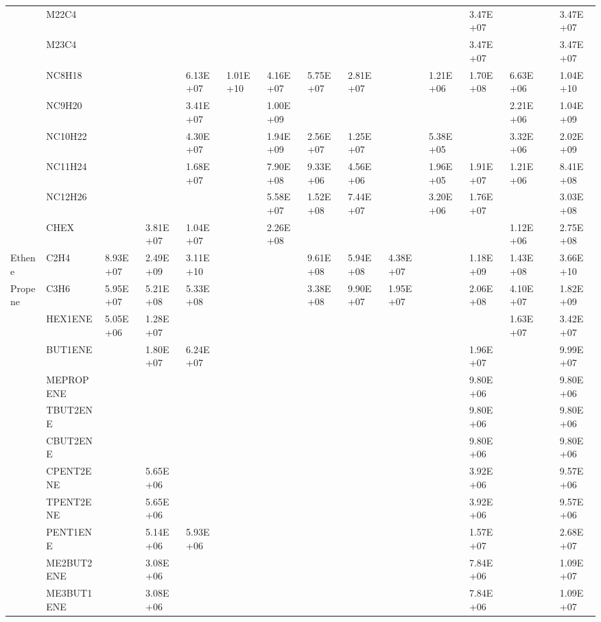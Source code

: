 \begin{longtable}{lllllllllllllll}
	 & M22C4 &  &  &  &  &  &  &  &  &  & 3.47E+07 &  &  & 3.47E+07 \\
	 & M23C4 &  &  &  &  &  &  &  &  &  & 3.47E+07 &  &  & 3.47E+07 \\
	 & NC8H18 &  &  & 6.13E+07 & 1.01E+10 & 4.16E+07 & 5.75E+07 & 2.81E+07 &  & 1.21E+06 & 1.70E+08 & 6.63E+06 &  & 1.04E+10 \\
	 & NC9H20 &  &  & 3.41E+07 &  & 1.00E+09 &  &  &  &  &  & 2.21E+06 &  & 1.04E+09 \\
	 & NC10H22 &  &  & 4.30E+07 &  & 1.94E+09 & 2.56E+07 & 1.25E+07 &  & 5.38E+05 &  & 3.32E+06 &  & 2.02E+09 \\
	 & NC11H24 &  &  & 1.68E+07 &  & 7.90E+08 & 9.33E+06 & 4.56E+06 &  & 1.96E+05 & 1.91E+07 & 1.21E+06 &  & 8.41E+08 \\
	 & NC12H26 &  &  &  &  & 5.58E+07 & 1.52E+08 & 7.44E+07 &  & 3.20E+06 & 1.76E+07 &  &  & 3.03E+08 \\
	 & CHEX &  & 3.81E+07 & 1.04E+07 &  & 2.26E+08 &  &  &  &  &  & 1.12E+06 &  & 2.75E+08 \\
	\hline Ethene & C2H4 & 8.93E+07 & 2.49E+09 & 3.11E+10 &  &  & 9.61E+08 & 5.94E+08 & 4.38E+07 &  & 1.18E+09 & 1.43E+08 &  & 3.66E+10 \\ \hline
	Propene & C3H6 & 5.95E+07 & 5.21E+08 & 5.33E+08 &  &  & 3.38E+08 & 9.90E+07 & 1.95E+07 &  & 2.06E+08 & 4.10E+07 &  & 1.82E+09 \\
	\hline \parbox[t]{2mm}{} & HEX1ENE & 5.05E+06 & 1.28E+07 &  &  &  &  &  &  &  &  & 1.63E+07 &  & 3.42E+07 \\
	 & BUT1ENE &  & 1.80E+07 & 6.24E+07 &  &  &  &  &  &  & 1.96E+07 &  &  & 9.99E+07 \\
	 & MEPROPENE &  &  &  &  &  &  &  &  &  & 9.80E+06 &  &  & 9.80E+06 \\
	 & TBUT2ENE &  &  &  &  &  &  &  &  &  & 9.80E+06 &  &  & 9.80E+06 \\
	 & CBUT2ENE &  &  &  &  &  &  &  &  &  & 9.80E+06 &  &  & 9.80E+06 \\
	 & CPENT2ENE &  & 5.65E+06 &  &  &  &  &  &  &  & 3.92E+06 &  &  & 9.57E+06 \\
	 & TPENT2ENE &  & 5.65E+06 &  &  &  &  &  &  &  & 3.92E+06 &  &  & 9.57E+06 \\
	 & PENT1ENE &  & 5.14E+06 & 5.93E+06 &  &  &  &  &  &  & 1.57E+07 &  &  & 2.68E+07 \\
	 & ME2BUT2ENE &  & 3.08E+06 &  &  &  &  &  &  &  & 7.84E+06 &  &  & 1.09E+07 \\
	 & ME3BUT1ENE &  & 3.08E+06 &  &  &  &  &  &  &  & 7.84E+06 &  &  & 1.09E+07 \\

\end{longtable}
